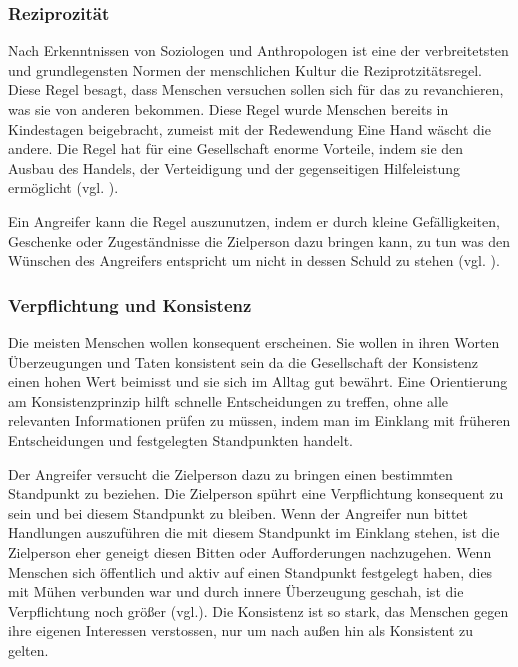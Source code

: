 \subsubsection{Reziprozität}

\glqq Nach Erkenntnissen von Soziologen und Anthropologen ist eine der verbreitetsten und grundlegensten Normen der menschlichen Kultur die Reziprotzitätsregel. Diese Regel besagt, dass Menschen versuchen sollen sich für das zu revanchieren, was sie von anderen bekommen.\grqq{} \cite{PsychDesÜberzeugensRezi} Diese Regel wurde Menschen bereits in Kindestagen beigebracht, zumeist mit der Redewendung \glqq Eine Hand wäscht die andere\grqq{}. Die Regel hat für eine Gesellschaft enorme Vorteile, indem sie den Ausbau des Handels, der Verteidigung und der gegenseitigen Hilfeleistung ermöglicht (vgl. \cite{rezi}). 

Ein Angreifer kann die Regel auszunutzen, indem er durch kleine Gefälligkeiten, Geschenke oder Zugeständnisse die Zielperson dazu bringen kann, zu tun was den Wünschen des Angreifers entspricht um nicht in dessen Schuld zu stehen (vgl. \cite{rezi}).


\subsubsection{Verpflichtung und Konsistenz}

Die meisten Menschen wollen konsequent erscheinen. Sie wollen in ihren Worten Überzeugungen und Taten konsistent sein da die Gesellschaft der Konsistenz einen hohen Wert beimisst und sie sich im Alltag gut bewährt. Eine Orientierung am Konsistenzprinzip hilft schnelle Entscheidungen zu treffen, ohne alle relevanten Informationen prüfen zu müssen, indem man im Einklang mit früheren Entscheidungen und festgelegten Standpunkten handelt.    

Der Angreifer versucht die Zielperson dazu zu bringen einen bestimmten Standpunkt zu beziehen. Die Zielperson spührt eine Verpflichtung konsequent zu sein und bei diesem Standpunkt zu bleiben. Wenn der Angreifer nun bittet Handlungen auszuführen die mit diesem Standpunkt im Einklang stehen, ist die Zielperson eher geneigt diesen Bitten oder Aufforderungen nachzugehen. Wenn Menschen sich öffentlich und aktiv auf einen Standpunkt festgelegt haben, dies mit Mühen verbunden war und durch innere Überzeugung geschah, ist die Verpflichtung noch größer (vgl.\cite{PsychDesÜberzeugensCom}). \glqq Die Konsistenz ist so stark, das Menschen gegen ihre eigenen Interessen verstossen, nur um nach außen hin als Konsistent zu gelten.\grqq{} \cite{ComundKon}

